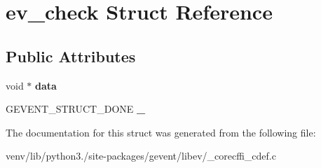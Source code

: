 \hypertarget{structev__check}{}\section{ev\+\_\+check Struct Reference}
\label{structev__check}
\subsection*{Public Attributes}
\begin{DoxyCompactItemize}
\item 
\mbox{\label{structev__check_a5861528e82ebb70fffa2dd1d6892759e}} 
void $\ast$ {\bfseries data}
\item 
\mbox{\label{structev__check_aa5326fa9199619d47259e6a10305d375}} 
G\+E\+V\+E\+N\+T\+\_\+\+S\+T\+R\+U\+C\+T\+\_\+\+D\+O\+NE {\bfseries \+\_\+}
\end{DoxyCompactItemize}


The documentation for this struct was generated from the following file\+:\begin{DoxyCompactItemize}
\item 
venv/lib/python3./site-\/packages/gevent/libev/\+\_\+corecffi\+\_\+cdef.\+c\end{DoxyCompactItemize}

